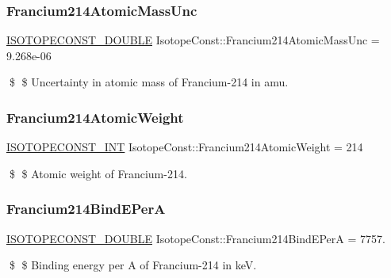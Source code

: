 \subsubsection{\texorpdfstring{Francium214\+Atomic\+Mass\+Unc}{Francium214AtomicMassUnc}}
{\footnotesize\ttfamily \mbox{\hyperlink{group___isotope_const-_macros_ga8f45a7272ce02c0b4c65c44636ed719a}{I\+S\+O\+T\+O\+P\+E\+C\+O\+N\+S\+T\+\_\+\+D\+O\+U\+B\+LE}} Isotope\+Const\+::\+Francium214\+Atomic\+Mass\+Unc = 9.\+268e-\/06}

\$ \$ Uncertainty in atomic mass of Francium-\/214 in amu. \mbox{\label{group___isotope_const-_francium-_fr214_ga67e3f1ab114f97a9526045c007788e2e}} 
\subsubsection{\texorpdfstring{Francium214\+Atomic\+Weight}{Francium214AtomicWeight}}
{\footnotesize\ttfamily \mbox{\hyperlink{group___isotope_const-_macros_ga5f18360b3e99483a35c32d789e62621c}{I\+S\+O\+T\+O\+P\+E\+C\+O\+N\+S\+T\+\_\+\+I\+NT}} Isotope\+Const\+::\+Francium214\+Atomic\+Weight = 214}

\$ \$ Atomic weight of Francium-\/214. \mbox{\label{group___isotope_const-_francium-_fr214_ga7e38a97114414eea8ad4148fd94958fe}} 
\subsubsection{\texorpdfstring{Francium214\+Bind\+E\+PerA}{Francium214BindEPerA}}
{\footnotesize\ttfamily \mbox{\hyperlink{group___isotope_const-_macros_ga8f45a7272ce02c0b4c65c44636ed719a}{I\+S\+O\+T\+O\+P\+E\+C\+O\+N\+S\+T\+\_\+\+D\+O\+U\+B\+LE}} Isotope\+Const\+::\+Francium214\+Bind\+E\+PerA = 7757.}

\$ \$ Binding energy per A of Francium-\/214 in keV. \mbox{\label{group___isotope_const-_francium-_fr214_ga5c2b278178ae6daa0d822bcfce3b8b10}} 
